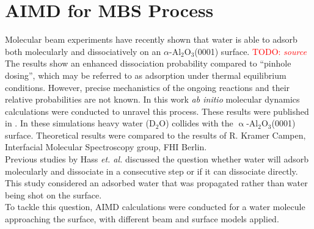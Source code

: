 \documentclass[11pt,DIV=13,BCOR=5mm,a4paper,headinclude]{scrbook}
\newcommand\todo[1]{\textcolor{red}{TODO: \textit{{#1}}}}
\begin{document}
  
\section{AIMD for MBS Process}\label{sec_0001AIMD}
Molecular beam experiments have recently shown that water is able to adsorb both molecularly
 and dissociatively on an $\alpha$-Al$_{\text{2}}$O$_{\text{3}}$(0001) surface. \todo{source}
 The results show an enhanced dissociation probability compared to ``pinhole dosing'', which may be referred to as adsorption 
 under thermal equilibrium conditions.
 However, precise mechanistics of the ongoing reactions 
 and their relative probabilities are not known.
 In this work \textit{ab initio} molecular dynamics calculations
 were conducted to unravel this process.
These results were published in \cite{Heiden0001_2018}.
 In these simulations heavy water (D$_2$O) collides with the $\upalpha$-Al$_{\text{2}}$O$_{\text{3}}$(0001) surface.
Theoretical results were compared to the results of R.
Kramer Campen, Interfacial Molecular Spectroscopy group, FHI Berlin.
 \\
 Previous studies by Hass \textit{et. al.}\cite{hass98,hass00} discussed the question whether water will adsorb molecularly and dissociate in a consecutive step or if it can dissociate directly.
This study considered an adsorbed water that was propagated rather than water being shot on the surface.
 \\
 To tackle this question, AIMD calculations were conducted for a water molecule approaching the surface, with different beam and surface models applied.
\end{document}
